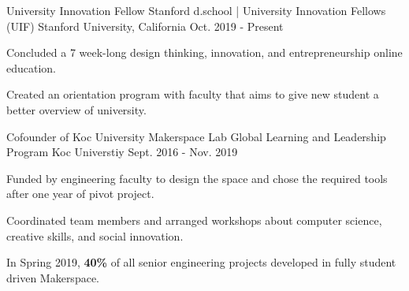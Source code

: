 \begin{cventries}
  \cventry
    {University Innovation Fellow} %
    {Stanford d.school | University Innovation Fellows (UIF)} %
    {Stanford University, California} %
    {Oct. 2019 - Present} %
    {
    \begin{cvitems} %
        \item {Concluded a 7 week-long design thinking, innovation, and entrepreneurship online education.}
        \item {Created an orientation program with faculty that aims to give new student a better overview of university.}
     \end{cvitems}
    }
    \vspace{2mm}
  \cventry
    {Cofounder of Koc University Makerspace Lab} %
    {Global Learning and Leadership Program} %
    {Koc Universtiy} %
    {Sept. 2016 - Nov. 2019} %
    {
      \begin{cvitems} %
        \item {Funded by engineering faculty to design the space and chose the required tools after one year of pivot project.}
        \item {Coordinated team members and arranged workshops about computer science, creative skills, and social innovation.}
        \item {In Spring 2019, \textbf{40\%} of all senior engineering projects developed in fully student driven Makerspace.}

\end{cvitems}}
\end{cventries}
